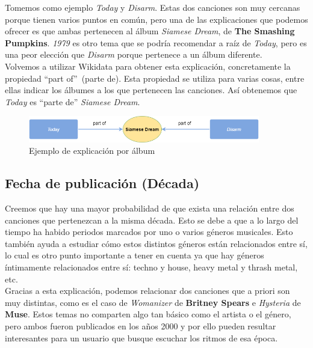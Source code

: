 Tomemos como ejemplo \textit{Today} y \textit{Disarm}. Estas dos canciones son muy cercanas porque tienen varios puntos en común, pero una de las explicaciones que podemos ofrecer es que ambas pertenecen al álbum \textit{Siamese Dream}, de \textbf{The Smashing Pumpkins}. \textit{1979} es otro tema que se podría recomendar a raíz de \textit{Today}, pero es una peor elección que \textit{Disarm} porque pertenece a un álbum diferente.\\

Volvemos a utilizar Wikidata para obtener esta explicación, concretamente la propiedad ``part of''~(parte de). Esta propiedad se utiliza para varias cosas, entre ellas indicar los álbumes a los que pertenecen las canciones. Así obtenemos que \textit{Today} es ``parte de'' \textit{Siamese Dream}.\\

\begin{figure}[h!]
	\centering
	\includegraphics[width = 0.9\textwidth]{Imagenes/Bitmap/Álbum ejemplo.png}
	\caption{Ejemplo de explicación por álbum}
	\label{fig:sampleImage}
\end{figure}

\subsection*{Fecha de publicación (Década)}

Creemos que hay una mayor probabilidad de que exista una relación entre dos canciones que pertenezcan a la misma década. Esto se debe a que a lo largo del tiempo ha habido periodos marcados por uno o varios géneros musicales. Esto también ayuda a estudiar cómo estos distintos géneros están relacionados entre sí, lo cual es otro punto importante a tener en cuenta ya que hay géneros íntimamente relacionados entre sí: techno y house, heavy metal y thrash metal, etc.\\

Gracias a esta explicación, podemos relacionar dos canciones que a priori son muy distintas, como es el caso de \textit{Womanizer} de \textbf{Britney Spears} e \textit{Hysteria} de \textbf{Muse}. Estos temas no comparten algo tan básico como el artista o el género, pero ambos fueron publicados en los años 2000 y por ello pueden resultar interesantes para un usuario que busque escuchar los ritmos de esa época.\\

